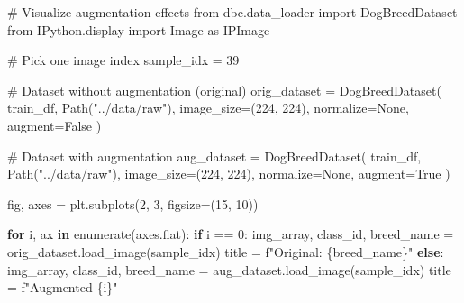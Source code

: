 \documentclass[
  letterpaper,
  DIV=11,
  numbers=noendperiod]{scrartcl}
\newenvironment{Shaded}{\begin{snugshade}}{\end{snugshade}}
\newcommand{\BuiltInTok}[1]{\textcolor[rgb]{0.00,0.23,0.31}{#1}}
\newcommand{\CommentTok}[1]{\textcolor[rgb]{0.37,0.37,0.37}{#1}}
\newcommand{\ControlFlowTok}[1]{\textcolor[rgb]{0.00,0.23,0.31}{\textbf{#1}}}
\newcommand{\DecValTok}[1]{\textcolor[rgb]{0.68,0.00,0.00}{#1}}
\newcommand{\ImportTok}[1]{\textcolor[rgb]{0.00,0.46,0.62}{#1}}
\newcommand{\KeywordTok}[1]{\textcolor[rgb]{0.00,0.23,0.31}{\textbf{#1}}}
\newcommand{\NormalTok}[1]{\textcolor[rgb]{0.00,0.23,0.31}{#1}}
\newcommand{\OperatorTok}[1]{\textcolor[rgb]{0.37,0.37,0.37}{#1}}
\newcommand{\SpecialCharTok}[1]{\textcolor[rgb]{0.37,0.37,0.37}{#1}}
\newcommand{\SpecialStringTok}[1]{\textcolor[rgb]{0.13,0.47,0.30}{#1}}
\newcommand{\StringTok}[1]{\textcolor[rgb]{0.13,0.47,0.30}{#1}}
\newcommand{\VariableTok}[1]{\textcolor[rgb]{0.07,0.07,0.07}{#1}}
\renewenvironment{Shaded}{%
  \begin{tcolorbox}[%
    enhanced,%
    colback=codebg,%
    colframe=codebg,%
    borderline west={3pt}{0pt}{sectionblue},%
    boxrule=0pt,%
    arc=0pt,%
    boxsep=5pt,%
    left=2mm,%
    right=2mm,%
    top=2mm,%
    bottom=2mm%
  ]%
}{%
  \end{tcolorbox}%
}
\begin{document}
\begin{Shaded}
\begin{Highlighting}[]
\CommentTok{\# Visualize augmentation effects}
\ImportTok{from}\NormalTok{ dbc.data\_loader }\ImportTok{import}\NormalTok{ DogBreedDataset}
\ImportTok{from}\NormalTok{ IPython.display }\ImportTok{import}\NormalTok{ Image }\ImportTok{as}\NormalTok{ IPImage}

\CommentTok{\# Pick one image index}
\NormalTok{sample\_idx }\OperatorTok{=} \DecValTok{39}

\CommentTok{\# Dataset without augmentation (original)}
\NormalTok{orig\_dataset }\OperatorTok{=}\NormalTok{ DogBreedDataset(}
\NormalTok{    train\_df,}
\NormalTok{    Path(}\StringTok{"../data/raw"}\NormalTok{),}
\NormalTok{    image\_size}\OperatorTok{=}\NormalTok{(}\DecValTok{224}\NormalTok{, }\DecValTok{224}\NormalTok{),}
\NormalTok{    normalize}\OperatorTok{=}\VariableTok{None}\NormalTok{,}
\NormalTok{    augment}\OperatorTok{=}\VariableTok{False}
\NormalTok{)}

\CommentTok{\# Dataset with augmentation}
\NormalTok{aug\_dataset }\OperatorTok{=}\NormalTok{ DogBreedDataset(}
\NormalTok{    train\_df,}
\NormalTok{    Path(}\StringTok{"../data/raw"}\NormalTok{),}
\NormalTok{    image\_size}\OperatorTok{=}\NormalTok{(}\DecValTok{224}\NormalTok{, }\DecValTok{224}\NormalTok{),}
\NormalTok{    normalize}\OperatorTok{=}\VariableTok{None}\NormalTok{,}
\NormalTok{    augment}\OperatorTok{=}\VariableTok{True}
\NormalTok{)}

\NormalTok{fig, axes }\OperatorTok{=}\NormalTok{ plt.subplots(}\DecValTok{2}\NormalTok{, }\DecValTok{3}\NormalTok{, figsize}\OperatorTok{=}\NormalTok{(}\DecValTok{15}\NormalTok{, }\DecValTok{10}\NormalTok{))}

\ControlFlowTok{for}\NormalTok{ i, ax }\KeywordTok{in} \BuiltInTok{enumerate}\NormalTok{(axes.flat):}
    \ControlFlowTok{if}\NormalTok{ i }\OperatorTok{==} \DecValTok{0}\NormalTok{:}
\NormalTok{        img\_array, class\_id, breed\_name }\OperatorTok{=}\NormalTok{ orig\_dataset.load\_image(sample\_idx)}
\NormalTok{        title }\OperatorTok{=} \SpecialStringTok{f"Original: }\SpecialCharTok{\{}\NormalTok{breed\_name}\SpecialCharTok{\}}\SpecialStringTok{"}
    \ControlFlowTok{else}\NormalTok{:}
\NormalTok{        img\_array, class\_id, breed\_name }\OperatorTok{=}\NormalTok{ aug\_dataset.load\_image(sample\_idx)}
\NormalTok{        title }\OperatorTok{=} \SpecialStringTok{f"Augmented }\SpecialCharTok{\{}\NormalTok{i}\SpecialCharTok{\}}\SpecialStringTok{"}
    

\end{Highlighting}
\end{Shaded}
\end{document}
